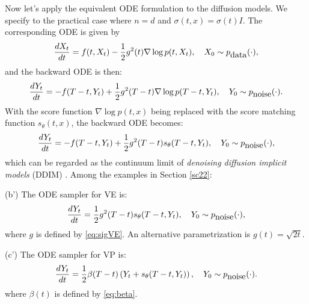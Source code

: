 \documentclass[letterpaper,11pt,reqno]{amsart}
\numberwithin{equation}{section}
\begin{document}
\quad Now let's apply the equivalent ODE formulation to the diffusion models. 
We specify to the practical case where $n = d$ and $\sigma(t,x) = \sigma(t) I$.
The corresponding ODE is given by
\begin{equation}
\label{eq:ODDE}
\frac{dX_t}{dt} = f(t,X_t) - \frac{1}{2} g^2(t) \nabla \log p (t, X_t), 
\quad X_0 \sim p_{\tiny \mbox{data}}(\cdot),
\end{equation}
and the backward ODE is then:
\begin{equation}
\label{eq:ODEreverse}
\frac{dY_t}{ dt} =  - f(T-t, Y_t) + \frac{1}{2} g^2(T-t)\nabla \log p(T-t, Y_t), \quad Y_0 \sim p_{\tiny \mbox{noise}}(\cdot).
\end{equation}
With the score function $\nabla \log p(t,x)$ being replaced with the score matching function $s_\theta(t,x)$,
the backward ODE becomes:
\begin{equation}
\label{eq:ODEreverse2}
\frac{dY_t}{ dt} = - f(T-t, Y_t) + \frac{1}{2} g^2(T-t)s_\theta(T-t, Y_t), \quad Y_0 \sim p_{\tiny \mbox{noise}}(\cdot),
\end{equation}
which can be regarded as the continuum limit of {\em denoising diffusion implicit models} (DDIM) \cite{DDIM}.
Among the examples in Section \ref{sc22}:


\smallskip
\noindent
(b') The ODE sampler for VE is:
\begin{equation}
\label{eq:ODEVE}
\frac{dY_t}{ dt} =   \frac{1}{2} g^2(T-t) s_\theta(T-t, Y_t), \quad Y_0 \sim p_{\tiny \mbox{noise}}(\cdot),
\end{equation}
where $g$ is defined by \eqref{eq:sigVE}. 
An alternative parametrization is $g(t) = \sqrt{2 t}$.

\medskip
\noindent
(c') 
The ODE sampler for VP is:
\begin{equation}
\label{eq:ODEVP}
\frac{dY_t}{ dt} =  \frac{1}{2} \beta(T-t) \left( Y_t + s_\theta(T-t, Y_t)\right), \quad Y_0 \sim p_{\tiny \mbox{noise}}(\cdot).
\end{equation}
where $\beta(t)$ is defined by \eqref{eq:beta}.

\end{document}
